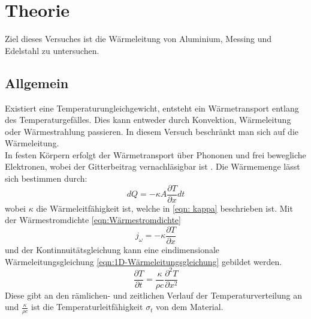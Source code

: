 \section{Theorie}
\label{sec:Theorie}
 
Ziel dieses Versuches ist die Wärmeleitung von Aluminium, Messing und Edelstahl zu untersuchen.

\subsection{Allgemein}

Existiert eine Temperaturungleichgewicht, entsteht ein Wärmetransport entlang des Temperaturgefälles. 
Dies kann entweder durch Konvektion, Wärmeleitung oder Wärmestrahlung passieren.
In diesem Versuch beschränkt man sich auf die Wärmeleitung.\\
In festen Körpern erfolgt der Wärmetransport über Phononen und frei bewegliche Elektronen, wobei der Gitterbeitrag vernachläsigbar ist \cite[1]{V204}.
Die Wärmemenge lässt sich bestimmen durch:
\begin{equation}
    dQ = -\kappa A \frac{\partial T}{\partial x} dt
    \label{eqn:Wärmemenge}
\end{equation}
wobei $\kappa$ die Wärmeleitfähigkeit ist, welche in \autoref{eqn: kappa} beschrieben ist.
Mit der Wärmestromdichte \autoref{eqn:Wärmestromdichte}
\begin{equation}
    j_{\omega} = -\kappa\frac{\partial T}{\partial x}
    \label{eqn:Wärmestromdichte}
\end{equation}
und der Kontinnuitätsgleichung kann eine eindimensionale Wärmeleitungsgleichung \autoref{eqn:1D-Wärmeleitungsgleichung} gebildet werden.
\begin{equation}
    \frac{\partial T}{\partial t} = \frac{\kappa}{\rho c} \frac{\partial ^2 T}{\partial x^2}
    \label{eqn:1D-Wärmeleitungsgleichung}
\end{equation}
Diese gibt an den rämlichen- und zeitlichen Verlauf der Temperaturverteilung an und $\frac{\kappa}{\rho c}$ ist die Temperaturleitfähigkeit $\sigma_t$ von dem Material.
